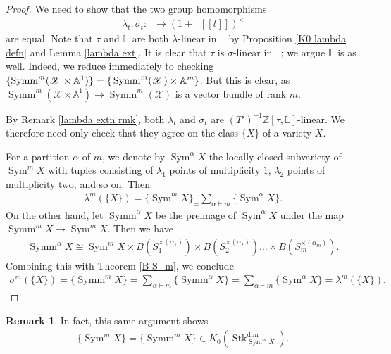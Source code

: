 \documentclass{amsart}
\theoremstyle{definition}
\newtheorem{rmk}[thm]{Remark}
\DeclareMathOperator{\Sym}{Sym}
\DeclareMathOperator{\Stk}{Stk}
\DeclareMathOperator{\Symm}{Symm}
\DeclareMathOperator{\Kstk}{K_0(\Stk_k^{\dim})}
\numberwithin{equation}{section}
\begin{document}
\begin{proof}
We need to show that the two group homomorphisms
\begin{align*}
    \lambda_t, \sigma_t: \Kstk \rightarrow (1+\Kstk[[t]])^\times
\end{align*}
are equal. Note that $\tau$ and $\mathbb{L}$ are both $\lambda$-linear in $\Kstk$ by Proposition \ref{K0 lambda defn} and Lemma \ref{lambda ext}. It is clear that $\tau$ is $\sigma$-linear in $\Kstk$; we argue $\mathbb{L}$ is as well. Indeed, we reduce immediately to checking $\{ \Symm^m (\mathscr{X} \times \mathbb{A}^1) \} = \mathbb\{ \Symm^m(\mathscr{X}) \times \mathbb{A}^m \}$. But this is clear, as $\Symm^m(\mathscr{X} \times \mathbb{A}^1) \rightarrow \Symm^m(\mathscr{X})$ is a vector bundle of rank $m$.

By Remark \ref{lambda extn rmk}, both $\lambda_t$ and $\sigma_t$ are $(T')^{-1} \mathbb{Z}[\tau, \mathbb{L}]$-linear. We therefore need only check that they agree on the class $\{ X \}$ of a variety $X$.

For a partition $\alpha$ of $m$, we denote by $\Sym^\alpha X$ the locally closed subvariety of $\Sym^m X$ with tuples consisting of $\lambda_1$ points of multiplicity $1$, $\lambda_2$ points of multiplicity two, and so on. Then
\begin{align*}
    \lambda^m( \{ X \} ) = \{ \Sym^m X \}_= \sum_{\alpha \vdash m} \{ \Sym^\alpha X \}.
\end{align*}
On the other hand, let $\Symm^\alpha X$ be the preimage of $\Sym^\alpha X$ under the map $\Symm^m X \rightarrow \Sym^m X$. Then we have 
\begin{align*}
    \Symm^\alpha X \cong \Sym^m X \times B(S_1^{\times(\alpha_1)}) \times B(S_2^{\times(\alpha_2)}) \ldots \times B(S_m^{\times(\alpha_m)}).
\end{align*}
Combining this with Theorem \ref{B S_m}, we conclude
\begin{align*}
    \sigma^m( \{ X \} ) = \{ \Symm^m X \} = \sum_{\alpha \vdash m} \{ \Symm^\alpha X \} = \sum_{\alpha \vdash m} \{ \Sym^\alpha X \}
    = \lambda^m( \{ X \}).
\end{align*}
\end{proof}

\begin{rmk}\label{sym = symm}
In fact, this same argument shows
\begin{align*}
    \{ \Sym^m X \} = \{ \Symm^m X \} \in K_0(\Stk_{\Sym^m X}^{\dim}).
\end{align*}
\end{rmk}
\end{document}
